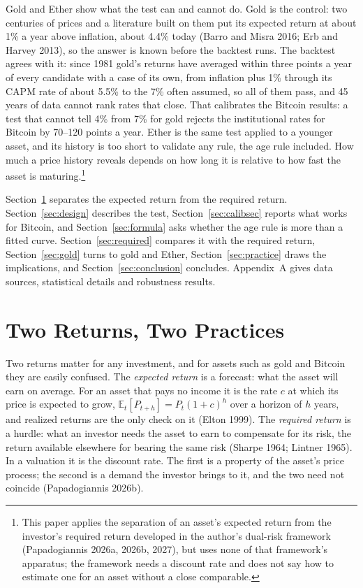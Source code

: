 \documentclass[12pt]{article}
\theoremstyle{plain}
\theoremstyle{remark}
\newcommand{\E}{\mathbb{E}}
\begin{document}
Gold and Ether show what the test can and cannot do. Gold is the control: two centuries of prices and a literature built on them put its expected return at about 1\% a year above inflation, about 4.4\% today (Barro and Misra 2016; Erb and Harvey 2013), so the answer is known before the backtest runs. The backtest agrees with it: since 1981 gold's returns have averaged within three points a year of every candidate with a case of its own, from inflation plus 1\% through its CAPM rate of about 5.5\% to the 7\% often assumed, so all of them pass, and 45 years of data cannot rank rates that close. That calibrates the Bitcoin results: a test that cannot tell 4\% from 7\% for gold rejects the institutional rates for Bitcoin by 70--120 points a year. Ether is the same test applied to a younger asset, and its history is too short to validate any rule, the age rule included. How much a price history reveals depends on how long it is relative to how fast the asset is maturing.\footnote{This paper applies the separation of an asset's expected return from the investor's required return developed in the author's dual-risk framework (Papadogiannis 2026a, 2026b, 2027), but uses none of that framework's apparatus; the framework needs a discount rate and does not say how to estimate one for an asset without a close comparable.}

Section~\ref{sec:setc} separates the expected return from the required return. Section~\ref{sec:design} describes the test, Section~\ref{sec:calibsec} reports what works for Bitcoin, and Section~\ref{sec:formula} asks whether the age rule is more than a fitted curve. Section~\ref{sec:required} compares it with the required return, Section~\ref{sec:gold} turns to gold and Ether, Section~\ref{sec:practice} draws the implications, and Section~\ref{sec:conclusion} concludes. Appendix~A gives data sources, statistical details and robustness results.

\section{Two Returns, Two Practices}\label{sec:setc}

Two returns matter for any investment, and for assets such as gold and Bitcoin they are easily confused. The \emph{expected return} is a forecast: what the asset will earn on average. For an asset that pays no income it is the rate $c$ at which its price is expected to grow, $\E_t[P_{t+h}]=P_t(1+c)^h$ over a horizon of $h$ years, and realized returns are the only check on it (Elton 1999). The \emph{required return} is a hurdle: what an investor needs the asset to earn to compensate for its risk, the return available elsewhere for bearing the same risk (Sharpe 1964; Lintner 1965). In a valuation it is the discount rate. The first is a property of the asset's price process; the second is a demand the investor brings to it, and the two need not coincide (Papadogiannis 2026b).
\end{document}
